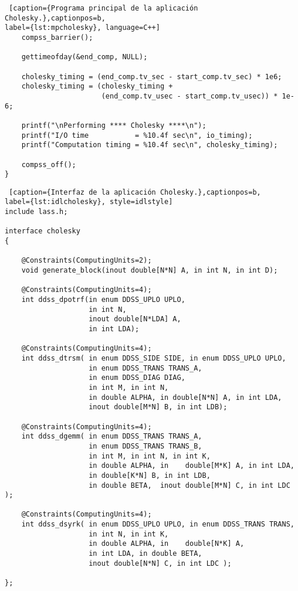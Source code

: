 \begin{lstlisting} [caption={Programa principal de la aplicación Cholesky.},captionpos=b, 
label={lst:mpcholesky}, language=C++]
    compss_barrier();

    gettimeofday(&end_comp, NULL);

    cholesky_timing = (end_comp.tv_sec - start_comp.tv_sec) * 1e6;
    cholesky_timing = (cholesky_timing + 
					   (end_comp.tv_usec - start_comp.tv_usec)) * 1e-6; 

    printf("\nPerforming **** Cholesky ****\n");
    printf("I/O time           = %10.4f sec\n", io_timing);
    printf("Computation timing = %10.4f sec\n", cholesky_timing);

    compss_off(); 
}
\end{lstlisting}

\begin{lstlisting} [caption={Interfaz de la aplicación Cholesky.},captionpos=b, 
label={lst:idlcholesky}, style=idlstyle]
include lass.h;
  
interface cholesky
{

    @Constraints(ComputingUnits=2);
    void generate_block(inout double[N*N] A, in int N, in int D);

    @Constraints(ComputingUnits=4);
    int ddss_dpotrf(in enum DDSS_UPLO UPLO, 
					in int N, 
					inout double[N*LDA] A, 
					in int LDA);

    @Constraints(ComputingUnits=4);
    int ddss_dtrsm( in enum DDSS_SIDE SIDE, in enum DDSS_UPLO UPLO,
                    in enum DDSS_TRANS TRANS_A, 
					in enum DDSS_DIAG DIAG,
                    in int M, in int N,
                    in double ALPHA, in double[N*N] A, in int LDA,
                    inout double[M*N] B, in int LDB);

    @Constraints(ComputingUnits=4);
    int ddss_dgemm( in enum DDSS_TRANS TRANS_A, 
					in enum DDSS_TRANS TRANS_B,
                    in int M, in int N, in int K,
                    in double ALPHA, in    double[M*K] A, in int LDA,
                    in double[K*N] B, in int LDB,
                    in double BETA,  inout double[M*N] C, in int LDC );

    @Constraints(ComputingUnits=4);
    int ddss_dsyrk( in enum DDSS_UPLO UPLO, in enum DDSS_TRANS TRANS,
                    in int N, in int K,
                    in double ALPHA, in    double[N*K] A, 
					in int LDA, in double BETA,  
					inout double[N*N] C, in int LDC );

};
\end{lstlisting}
